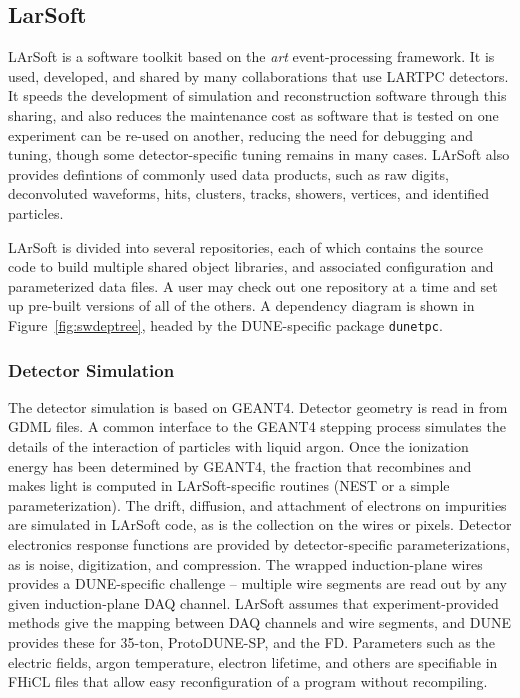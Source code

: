 \subsection{LarSoft}

LArSoft is a software toolkit based on the {\it art} event-processing framework.  It is used, developed, and
shared by many collaborations that use LARTPC detectors.  It speeds the development of simulation and reconstruction
software through this sharing, and also reduces the maintenance cost as software that is tested on one
experiment can be re-used on another, reducing the need for debugging and tuning, though some detector-specific
tuning remains in many cases.  LArSoft also provides defintions of commonly used data products, such as raw digits,
deconvoluted waveforms, hits, clusters, tracks, showers, vertices, and identified particles.

LArSoft is divided into several repositories, each of which contains the source code to build multiple shared
object libraries, and associated configuration and parameterized data files.  A user may check out one repository
at a time and set up pre-built versions of all of the others.  A dependency diagram is shown in 
Figure~\ref{fig:swdeptree}, headed by the DUNE-specific package {\tt dunetpc}.

\subsubsection{Detector Simulation}

The detector simulation is based on GEANT4.  Detector geometry is read in from GDML files.  A common interface to
the GEANT4 stepping process simulates the details of the interaction of particles with liquid argon.  Once
the ionization energy has been determined by GEANT4, the fraction that recombines and makes light is computed
in LArSoft-specific routines (NEST or a simple parameterization).  The drift, diffusion, and attachment of electrons
on impurities are simulated in LArSoft code, as is the collection on the wires or pixels.  Detector electronics
response functions are provided by detector-specific parameterizations, as is noise, digitization, and compression.
The wrapped induction-plane wires provides a DUNE-specific challenge -- multiple wire segments are read out by
any given induction-plane DAQ channel.  LArSoft assumes that experiment-provided methods give the mapping between
DAQ channels and wire segments, and DUNE provides these for 35-ton, ProtoDUNE-SP, and the FD.  Parameters
such as the electric fields, argon temperature, electron lifetime, and others are specifiable in FHiCL files
that allow easy reconfiguration of a program without recompiling.

